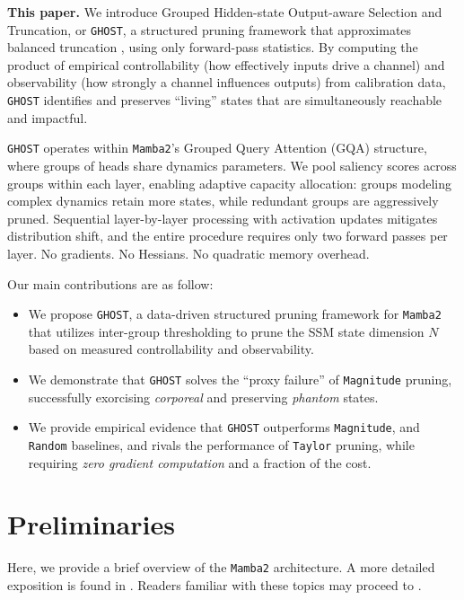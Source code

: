 \documentclass{article}
\theoremstyle{plain}
\theoremstyle{definition}
\theoremstyle{remark}
\begin{document}
\textbf{This paper.}
We introduce Grouped Hidden-state Output-aware Selection and Truncation, or \texttt{GHOST}, a structured pruning framework that approximates balanced truncation \citep{moore_principal_1981}, using only forward-pass statistics. By computing the product of empirical controllability (how effectively inputs drive a channel) and observability (how strongly a channel influences outputs) from calibration data, \texttt{GHOST} identifies and preserves ``living'' states that are simultaneously reachable and impactful.

\texttt{GHOST} operates within \texttt{Mamba2}'s Grouped Query Attention (GQA) structure, where groups of heads share dynamics parameters. We pool saliency scores across groups within each layer, enabling adaptive capacity allocation: groups modeling complex dynamics retain more states, while redundant groups are aggressively pruned. Sequential layer-by-layer processing with activation updates mitigates distribution shift, and the entire procedure requires only two forward passes per layer. No gradients. No Hessians. No quadratic memory overhead.

Our main contributions are as follow:
\begin{itemize}[leftmargin=*]
\item We propose \texttt{GHOST}, a data-driven structured pruning framework for \texttt{Mamba2} that utilizes inter-group thresholding to prune the SSM state dimension $N$ based on measured controllability and observability.
\item We demonstrate that \texttt{GHOST} solves the ``proxy failure'' of \texttt{Magnitude} pruning, successfully exorcising \textit{corporeal} and preserving \textit{phantom} states.
\item We provide empirical evidence that \texttt{GHOST} outperforms \texttt{Magnitude}, and \texttt{Random} baselines, and rivals the performance of \texttt{Taylor} pruning, while requiring \textit{zero gradient computation} and a fraction of the cost.
\end{itemize}



\section{Preliminaries}
\label{sec:preliminaries}
Here, we provide a brief overview of the \texttt{Mamba2} architecture. A more detailed exposition is found in . Readers familiar with these topics may proceed to .
\end{document}
